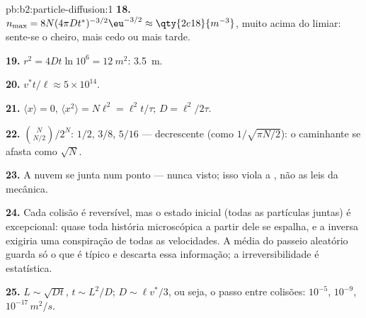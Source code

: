 \begin{solution}{pb:b2:particle-diffusion:1}
\textbf{18.} $n_{\max} = 8N(4\pi Dt^*)^{-3/2}\eu^{-3/2} \approx \qty{2e18}{m^{-3}}$,
muito acima do limiar: sente-se o cheiro, mais cedo ou mais tarde.

\textbf{19.} $r^2 = 4Dt\ln 10^6 = \qty{12}{m^2}$: \qty{3.5}{m}.

\textbf{20.} $v^*t/\ell \approx 5 \times 10^{14}$.

\textbf{21.} $\langle x\rangle = 0$, $\langle x^2\rangle = N\ell^2 = \ell^2 t/\tau$;
$D = \ell^2/2\tau$.

\textbf{22.} $\binom{N}{N/2}/2^N$: $1/2$, $3/8$, $5/16$ --- decrescente
(como $1/\sqrt{\pi N/2}$): o caminhante se afasta como $\sqrt N$.

\textbf{23.} A nuvem se junta num ponto --- nunca visto; isso
viola a , não as leis da mecânica.

\textbf{24.} Cada colisão é reversível, mas o estado inicial (todas as
partículas juntas) é excepcional: quase toda história microscópica
a partir dele se espalha, e a inversa exigiria uma conspiração de todas as
velocidades. A média do passeio aleatório guarda só o que é típico e
descarta essa informação; a irreversibilidade é estatística.

\textbf{25.} $L \sim \sqrt{Dt}$, $t \sim L^2/D$; $D \sim \ell v^*/3$, ou seja,
o passo entre colisões: $10^{-5}$, $10^{-9}$, $10^{-17}\,\unit{m^2/s}$.
\end{solution}
